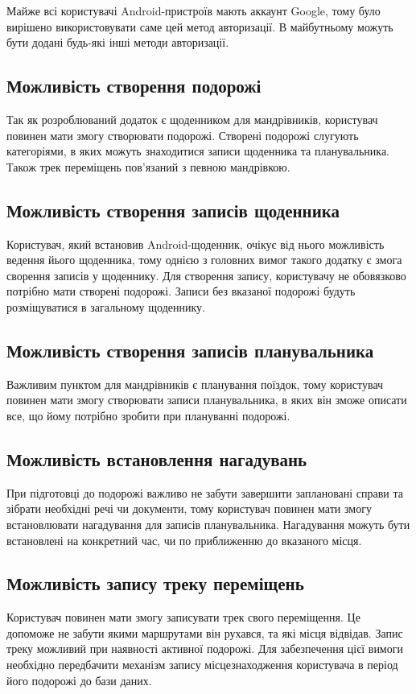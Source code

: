 \documentclass[../main.tex]{subfiles}
\begin{document}
Майже всі користувачі Android-пристроїв мають аккаунт Google, тому було вирішено використовувати саме цей метод авторизації. В майбутньому можуть бути додані будь-які інші методи авторизації.

\subsection{Можливість створення подорожі}
Так як розроблюваний додаток є щоденником для мандрівників, користувач повинен мати змогу створювати подорожі. Створені подорожі слугують категоріями, в яких можуть знаходитися записи щоденника та планувальника. Також трек переміщень пов'язаний з певною мандрівкою.

\subsection{Можливість створення записів щоденника}
Користувач, який встановив Android-щоденник, очікує від нього можливість ведення йього щоденника, тому однією з головних вимог такого додатку є змога сворення записів у щоденнику. Для створення запису, користувачу не обовязково потрібно мати створені подорожі. Записи без вказаної подорожі будуть розміщуватися в загальному щоденнику.

\subsection{Можливість створення записів планувальника}
Важливим пунктом для мандрівників є планування поїздок, тому користувач повинен мати змогу створювати записи планувальника, в яких він зможе описати все, що йому потрібно зробити при плануванні подорожі.

\subsection{Можливість встановлення нагадувань}
При підготовці до подорожі важливо не забути завершити заплановані справи та зібрати необхідні речі чи документи, тому користувач повинен мати змогу встановлювати нагадування для записів планувальника. Нагадування можуть бути встановлені на конкретний час, чи по приближенню до вказаного місця.

\subsection{Можливість запису треку переміщень}
Користувач повинен мати змогу записувати трек свого переміщення. Це допоможе не забути якими маршрутами він рухався, та  які місця відвідав. Запис треку можливий при наявності активної подорожі. Для забезпечення цієї вимоги необхідно передбачити механізм запису місцезнаходження користувача в період його подорожі до бази даних.
\end{document}
